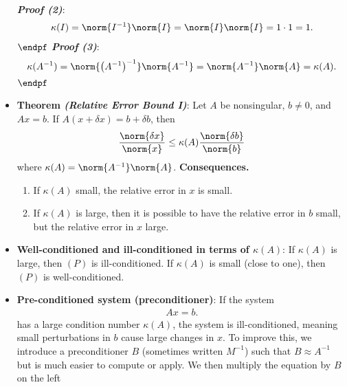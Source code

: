 \documentclass{report}
\begin{document}
\begin{itemize}
            \textbf{\textit{Proof (2)}}:
            \begin{align*}
                \kappa(I) = \norm{I^{-1}}\norm{I} = \norm{I} \norm{I} = 1 \cdot  1 = 1
            .\end{align*}
            $\endpf$
            \bigbreak \noindent 
            \textbf{\textit{Proof (3)}}:
            \begin{align*}
                \kappa(A^{-1}) = \norm{\left(A^{-1}\right)^{-1}}\norm{A^{-1}} = \norm{A^{-1}} \norm{A} = \kappa(A)
            .\end{align*}
            $\endpf$
        \item \textbf{Theorem \textit{(Relative Error Bound I)}}: Let $A$ be nonsingular, $b \ne 0$, and $Ax = b$. If $A(x + \delta  x) = b + \delta  b$, then
            \begin{align*}
                \frac{\norm{ \delta  x}}{\norm{ x}} \leq \kappa(A) \frac{\norm{\delta  b }}{\norm{ b}}
            \end{align*}
            where $\kappa(A) = \norm{A^{-1}}\norm{A}$.
            \bigbreak \noindent 
            \textbf{Consequences.}
            \begin{enumerate}
                \item If $\kappa(A)$ small, the relative error in $x$ is small.
                \item If $\kappa(A)$ is large, then it is possible to have the relative error in $b$ small, but the relative error in $x$ large.
            \end{enumerate}
        \item \textbf{Well-conditioned and ill-conditioned in terms of $\kappa(A)$}: If $\kappa(A)$ is large, then $(P)$ is ill-conditioned. If $\kappa(A)$ is small (close to one), then $(P)$ is well-conditioned.
        \item \textbf{Pre-conditioned system (preconditioner)}: If the system
            \begin{align*}
                Ax =b
            .\end{align*}
            has a large condition number $\kappa(A)$, the system is ill-conditioned, meaning small perturbations in $b$ cause large changes in $x$.
            \bigbreak \noindent 
            To improve this, we introduce a preconditioner $B$ (sometimes written $M^{-1}$) such that $B \approx A^{-1}$ but is much easier to compute or apply.
            \bigbreak \noindent 
            We then multiply the equation by $B$ on the left
            \begin{align*}

\end{align*}
\end{itemize}
\end{document}
